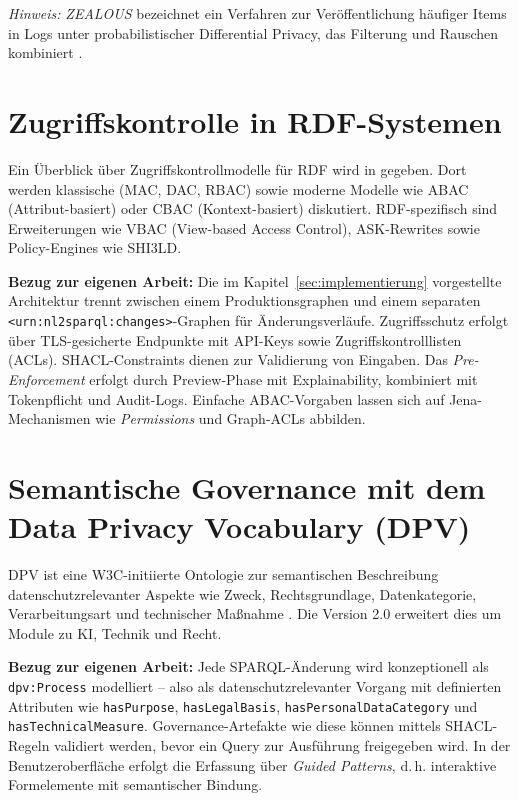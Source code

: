 \textit{Hinweis:} \emph{ZEALOUS} bezeichnet ein Verfahren zur Veröffentlichung häufiger Items in Logs unter probabilistischer Differential Privacy, das Filterung und Rauschen kombiniert \cite{GoetzZealous}.

\section{Zugriffskontrolle in RDF-Systemen}

Ein Überblick über Zugriffskontrollmodelle für RDF wird in \cite{kirrane-ac-survey} gegeben. Dort werden klassische (MAC, DAC, RBAC) sowie moderne Modelle wie ABAC (Attribut-basiert) oder CBAC (Kontext-basiert) diskutiert. RDF-spezifisch sind Erweiterungen wie VBAC (View-based Access Control), ASK-Rewrites sowie Policy-Engines wie SHI3LD.

\textbf{Bezug zur eigenen Arbeit:} Die im Kapitel~\ref{sec:implementierung} vorgestellte Architektur trennt zwischen einem Produktionsgraphen und einem separaten \texttt{<urn:nl2sparql:changes>}-Graphen für Änderungsverläufe. Zugriffsschutz erfolgt über TLS-gesicherte Endpunkte mit API-Keys sowie Zugriffskontrolllisten (ACLs). SHACL-Constraints dienen zur Validierung von Eingaben. Das \textit{Pre-Enforcement} erfolgt durch Preview-Phase mit Explainability, kombiniert mit Tokenpflicht und Audit-Logs. Einfache ABAC-Vorgaben lassen sich auf Jena-Mechanismen wie \textit{Permissions} und Graph-ACLs abbilden.

\section{Semantische Governance mit dem Data Privacy Vocabulary (DPV)}

DPV ist eine W3C-initiierte Ontologie zur semantischen Beschreibung datenschutzrelevanter Aspekte wie Zweck, Rechtsgrundlage, Datenkategorie, Verarbeitungsart und technischer Maßnahme \cite{dpv2024w3c}. Die Version 2.0 erweitert dies um Module zu KI, Technik und Recht.

\textbf{Bezug zur eigenen Arbeit:} Jede SPARQL-Änderung wird konzeptionell als \texttt{dpv:Process} modelliert – also als datenschutzrelevanter Vorgang mit definierten Attributen wie \texttt{hasPurpose}, \texttt{hasLegalBasis}, \texttt{hasPersonalDataCategory} und \texttt{hasTechnicalMeasure}. Governance-Artefakte wie diese können mittels SHACL-Regeln validiert werden, bevor ein Query zur Ausführung freigegeben wird. In der Benutzeroberfläche erfolgt die Erfassung über \textit{Guided Patterns}, d.\,h. interaktive Formelemente mit semantischer Bindung.

